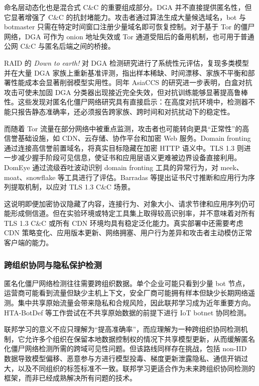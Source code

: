 命名层动态化也是混合式 C\&C 的重要组成部分。DGA 并不直接提供匿名性，但它显著增强了 C\&C 的抗封堵能力。攻击者通过算法生成大量候选域名，bot 与 botmaster 只需在特定时间窗口注册少量域名即可恢复控制。对于基于 Tor 的僵尸网络，DGA 可作为 onion 地址失效或 Tor 通道受阻后的备用机制，也可用于普通公网 C\&C 与匿名后端之间的桥接。

RAID 的 \textit{Down to earth!} 对 DGA 检测研究进行了系统性元评估，复现多类模型并在大量 DGA 家族上重新基准评测，指出样本稀缺、时间漂移、家族不平衡和部署性能成本会显著削弱模型实用性\cite{cebere2024down}。同年 AsiaCCS 的研究进一步表明，白盒对抗攻击可使未加固 DGA 分类器出现接近完全失效，但对抗训练能够显著提高鲁棒性\cite{drichel2024robust}。这些发现对匿名化僵尸网络研究具有直接启示：在高度对抗环境中，检测器不能只报告静态准确率，还必须报告跨家族、跨时间和对抗扰动下的稳定性。

而随着 Tor 流量在部分网络中被重点监测，攻击者也可能转向更具“正常性”的高信誉基础设施，如 CDN、云存储、协作平台和加密 Web 服务。Domain fronting 通过连接高信誉前置域名，将真实目标隐藏在加密 HTTP 语义中。TLS 1.3 则进一步减少握手阶段可见信息，使证书和应用层语义更难被边界设备直接利用。DomEye 通过流级吞吐波动识别 domain fronting 工具的异常行为，对 meek、moat、snowflake 等工具进行了评估\cite{xie2024domeye}。Barradas 等提出证书尺寸推断和应用行为序列提取机制，以应对 TLS 1.3 C\&C 场景\cite{barradas2024extending}。

这说明即便加密协议隐藏了内容，连接行为、对象大小、请求节律和应用序列仍可能形成侧信道。但在实验环境或特定工具集上取得较高识别率，并不意味着对所有 TLS 1.3 C\&C 或所有 CDN 环境均具有稳定泛化能力。真实部署中还需要考虑 CDN 策略变化、应用版本更新、网络拥塞、用户行为差异和攻击者主动模仿正常客户端的能力。

\subsubsection{跨组织协同与隐私保护检测}

匿名化僵尸网络检测往往需要跨组织数据。单个企业可能只看到少量 bot 节点，运营商可能看到流量但缺少主机上下文，安全厂商可能拥有样本但缺少长期网络遥测。集中共享原始流量会带来隐私和合规风险，因此联邦学习成为近年重要方向。HTA-BotDef 等工作尝试在不共享原始数据的前提下进行 IoT botnet 协同检测\cite{hossain2025htabotdef}。

联邦学习的意义不应只理解为“提高准确率”，而应理解为一种跨组织协同检测机制，它允许多个组织在保留本地数据控制权的情况下共享模型更新，从而缓解匿名化僵尸网络检测所需的跨域可见性问题。但该路线同样存在挑战，包括 non-IID 数据导致模型偏移、恶意参与方进行模型投毒、梯度更新泄露隐私、通信开销过大，以及不同组织的标签标准不一致。联邦学习更适合作为未来跨组织协同检测的框架，而非已经成熟解决所有问题的技术。


